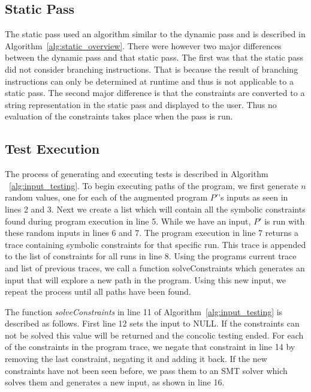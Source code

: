 \subsection{Static Pass}
\label{sec:static}

The static pass used an algorithm similar to the dynamic pass and is described in Algorithm~\ref{alg:static_overview}. There were however two major differences between the dynamic pass and that static pass. The first was that the static pass did not consider branching instructions. That is because the result of branching instructions can only be determined at runtime and thus is not applicable to a static pass. The second major difference is that the constraints are converted to a string representation in the static pass and displayed to the user. Thus no evaluation of the constraints takes place when the pass is run.


\subsection{Test Execution}

The process of generating and executing tests is described in Algorithm ~\ref{alg:input_testing}. To begin executing paths of the program, we first generate $n$ random values, one for each of the augmented program $P'$'s inputs as seen in lines 2 and 3. Next we create a list which will contain all the symbolic constraints found during program execution in line 5. While we have an input, $P'$ is run with these random inputs in lines 6 and 7. The program execution in line 7 returns a trace containing symbolic constraints for that specific run. This trace is appended to the list of constraints for all runs in line 8. Using the programs current trace and list of previous traces, we call a function solveConstraints which generates an input that will explore a new path in the program. Using this new input, we repeat the process until all paths have been found.

The function \textit{solveConstraints} in line 11 of Algorithm~\ref{alg:input_testing} is described as follows. First line 12 sets the input to NULL. If the constraints can not be solved this value will be returned and the concolic testing ended.  For each of the constraints in the program trace, we negate that constraint in line 14 by removing the last constraint, negating it and adding it back. If the new constraints have not been seen before, we pass them to an SMT solver which solves them and generates a new input, as shown in line 16. 

